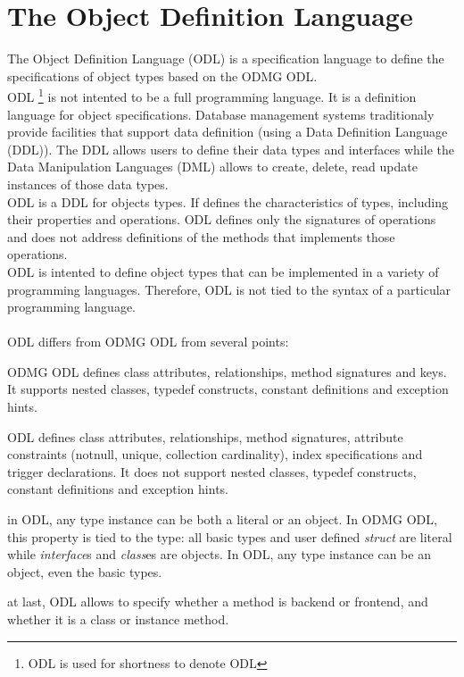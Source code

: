

\newcommand{\mantitle}{\textsc{Object Definition Language}}


\tableofcontents

\chapter*{The Object Definition Language}

The \eyedb Object Definition Language (ODL) is a specification language
to define the specifications of object types based on the ODMG ODL.\\
ODL \footnote{ODL is used for shortness to denote \eyedb ODL} 
is not intented to be a full programming language. It is
a definition language for object specifications. Database management
systems traditionaly provide facilities that support
data definition (using a Data Definition Language (DDL)). The DDL allows
users to define their data types and interfaces while the
Data Manipulation Languages (DML) allows to create, delete, read update
instances of those data types.\\
ODL is a DDL for objects types.
If defines the characteristics of types, including their properties
and operations.
ODL defines only the signatures of operations and does not address
definitions of the methods that implements those operations.
\\
ODL is intented to define object types that can be implemented
in a variety of programming languages. Therefore, ODL is not tied
to the syntax of a particular programming language.\\\\
\eyedb ODL differs from ODMG ODL from several points:
\bi
\item ODMG ODL defines class attributes, relationships, method signatures and keys.
It supports nested classes, typedef constructs, constant definitions and
exception hints.
\item \eyedb ODL defines class attributes, relationships, method signatures,
attribute constraints (notnull, unique, collection cardinality), index
specifications and trigger declarations. It does not support
nested classes, typedef constructs, constant definitions and
exception hints.
\item in \eyedb ODL, any type instance can be both a literal or
an object. In ODMG ODL, this property is tied to the type: all
basic types and user defined \emph{struct} are literal while \emph{interface}s
and \emph{class}es are objects.
In \eyedb ODL, any type instance can be an object, even the basic types.
\item at last, \eyedb ODL allows to specify whether a method is backend or frontend,
and whether it is a class or instance method.
\ei

